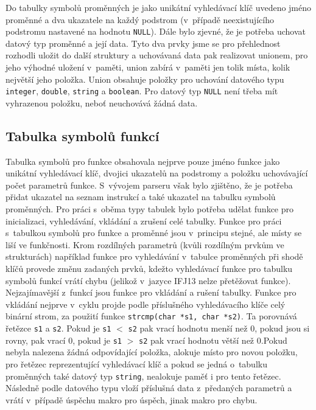 \documentclass[12pt,a4paper,titlepage,final]{article}
\begin{document}
    Do tabulky symbolů proměnných je jako unikátní vyhledávací klíč uvedeno
    jméno proměnné a dva ukazatele na každý podstrom (v~případě
    neexistujícího podstromu nastavené na hodnotu \texttt{NULL}). Dále bylo
    zjevné, že je potřeba uchovat datový typ proměnné a její data. Tyto dva
    prvky jsme se pro přehlednost rozhodli uložit do další struktury a
    uchovávaná data pak realizovat unionem, pro jeho výhodné uložení v~paměti,
    \clqq union zabírá v~paměti jen tolik místa, kolik největší jeho
    položka\crqq. Union obsahuje položky pro uchování datového typu
    \texttt{integer}, \texttt{double}, \texttt{string} a \texttt{boolean}.
    Pro datový typ \texttt{NULL} není třeba mít vyhrazenou položku, neboť
    neuchovává žádná data.

    \subsection{Tabulka symbolů funkcí}

    Tabulka symbolů pro funkce obsahovala nejprve pouze jméno funkce jako
    unikátní vyhledávací klíč, dvojici ukazatelů na podstromy a položku
    uchovávající počet parametrů funkce. S~vývojem parseru však bylo
    zjištěno, že je potřeba přidat ukazatel na seznam instrukcí a také
    ukazatel na tabulku symbolů proměnných. Pro práci s~oběma typy tabulek
    bylo potřeba udělat funkce pro inicializaci, vyhledávání, vkládání a
    zrušení celé tabulky. Funkce pro práci s~tabulkou symbolů pro funkce a
    proměnné jsou v~principu stejné, ale místy se liší ve funkčnosti. Krom
    rozdílných parametrů (kvůli rozdílným prvkům ve strukturách) například
    funkce pro vyhledávání v~tabulce proměnných při shodě klíčů provede změnu
    zadaných prvků, kdežto vyhledávací funkce pro tabulku symbolů funkcí
    vrátí chybu (jelikož v~jazyce IFJ13 nelze přetěžovat funkce).
    Nejzajímavější z~funkcí jsou funkce pro vkládání a rušení tabulky. Funkce
    pro vkládání nejprve v~cyklu projde podle příslušného vyhledávacího klíče
    celý binární strom, za použití funkce \texttt{strcmp(char *s1, char *s2)}.
    \clqq Ta porovnává řetězce \texttt{s1} a \texttt{s2}. Pokud je \texttt{s1}
    $<$ \texttt{s2} pak vrací hodnotu menší než $0$, pokud jsou si rovny, pak
    vrací $0$, pokud je \texttt{s1} $>$ \texttt{s2} pak vrací hodnotu větší
    než $0$.\crqq Pokud nebyla nalezena žádná odpovídající položka, alokuje
    místo pro novou položku, pro řetězec reprezentující vyhledávací klíč
    a pokud se jedná o~tabulku proměnných také datový typ \texttt{string},
    nealokuje paměť i pro tento řetězec. Následně podle datového typu vloží
    příslušná data z~předaných parametrů a vrátí v~případě úspěchu makro pro
    úspěch, jinak makro pro chybu.
\end{document}
